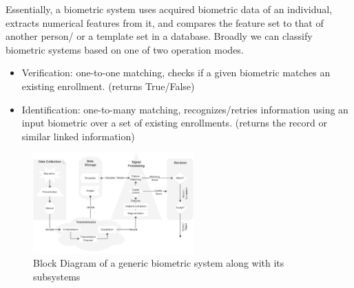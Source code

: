 Essentially, a biometric system uses acquired biometric data of an individual, extracts numerical features from it, and compares the feature set to that of another person/ or a template set in a database. 
Broadly we can classify biometric systems based on one of two operation modes.
\begin{itemize}
    \item Verification: one-to-one matching, checks if a given biometric matches an existing enrollment. (returns True/False)
    \item Identification: one-to-many matching, recognizes/retries information using an input biometric over a set of existing enrollments. (returns the record or similar linked information)
\end{itemize}




\begin{figure}[!ht]
    \centering 
    \includegraphics[width=0.55\textwidth]{images/Block diagram of a generic biometric system.png}
    \caption{Block Diagram of a generic biometric system along with its subsystems \cite{Leniski2003}}
    \label{fig:bio_sys_block}
\end{figure}

